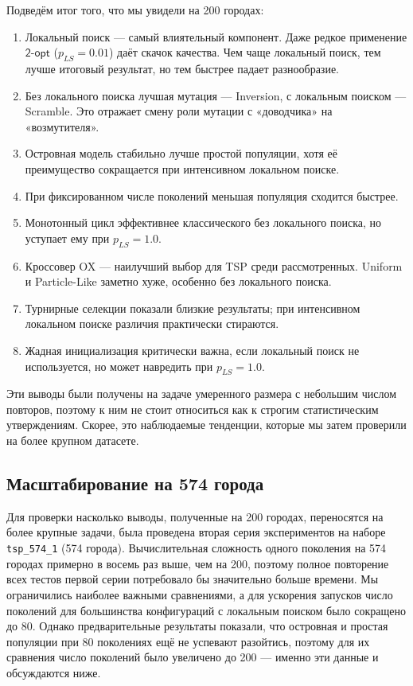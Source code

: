 \documentclass[a4paper,12pt]{article}
\begin{document}
Подведём итог того, что мы увидели на 200 городах:

\begin{enumerate}
    \item Локальный поиск --- самый влиятельный компонент. Даже редкое применение $\mathsf{2\mbox{-}opt}$ ($p_{LS}=0.01$) даёт скачок качества. Чем чаще локальный поиск, тем лучше итоговый результат, но тем быстрее падает разнообразие.
    \item Без локального поиска лучшая мутация --- Inversion, с локальным поиском --- Scramble. Это отражает смену роли мутации с «доводчика» на «возмутителя».
    \item Островная модель стабильно лучше простой популяции, хотя её преимущество сокращается при интенсивном локальном поиске.
    \item При фиксированном числе поколений меньшая популяция сходится быстрее.
    \item Монотонный цикл эффективнее классического без локального поиска, но уступает ему при $p_{LS}=1.0$.
    \item Кроссовер OX --- наилучший выбор для TSP среди рассмотренных. Uniform и Particle-Like заметно хуже, особенно без локального поиска.
    \item Турнирные селекции показали близкие результаты; при интенсивном локальном поиске различия практически стираются.
    \item Жадная инициализация критически важна, если локальный поиск не используется, но может навредить при $p_{LS}=1.0$.
\end{enumerate}

Эти выводы были получены на задаче умеренного размера с небольшим числом повторов, поэтому к ним не стоит относиться как к строгим статистическим утверждениям. Скорее, это наблюдаемые тенденции, которые мы затем проверили на более крупном датасете.

\subsection{Масштабирование на 574 города}

Для проверки насколько выводы, полученные на 200 городах, переносятся на более крупные задачи, была проведена вторая серия экспериментов на наборе \texttt{tsp\_574\_1} (574 города). Вычислительная сложность одного поколения на 574 городах примерно в восемь раз выше, чем на 200, поэтому полное повторение всех тестов первой серии потребовало бы значительно больше времени. Мы ограничились наиболее важными сравнениями, а для ускорения запусков число поколений для большинства конфигураций с локальным поиском было сокращено до 80. Однако предварительные результаты показали, что островная и простая популяции при 80 поколениях ещё не успевают разойтись, поэтому для их сравнения число поколений было увеличено до 200 — именно эти данные и обсуждаются ниже.
\end{document}
